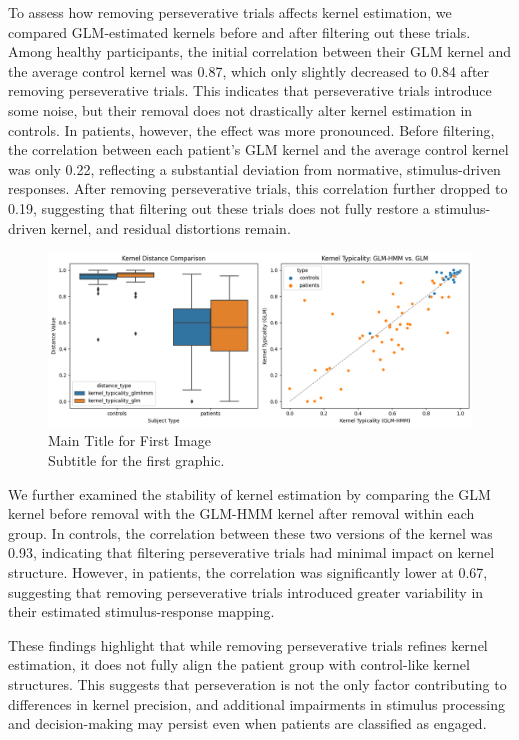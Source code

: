 To assess how removing perseverative trials affects kernel estimation, we compared GLM-estimated kernels before and after filtering out these trials. Among healthy participants, the initial correlation between their GLM kernel and the average control kernel was 0.87, which only slightly decreased to 0.84 after removing perseverative trials. This indicates that perseverative trials introduce some noise, but their removal does not drastically alter kernel estimation in controls. In patients, however, the effect was more pronounced. Before filtering, the correlation between each patient’s GLM kernel and the average control kernel was only 0.22, reflecting a substantial deviation from normative, stimulus-driven responses. After removing perseverative trials, this correlation further dropped to 0.19, suggesting that filtering out these trials does not fully restore a stimulus-driven kernel, and residual distortions remain.  
\begin{figure}[H]
    \centering
    \includegraphics[width=16cm]{MainLayout/Images/chapter7/distance.png}
    \caption{Main Title for First Image \\ \small Subtitle for the first graphic.}
    \label{fig:distance}
\end{figure}
We further examined the stability of kernel estimation by comparing the GLM kernel before removal with the GLM-HMM kernel after removal within each group. In controls, the correlation between these two versions of the kernel was 0.93, indicating that filtering perseverative trials had minimal impact on kernel structure. However, in patients, the correlation was significantly lower at 0.67, suggesting that removing perseverative trials introduced greater variability in their estimated stimulus-response mapping.  

These findings highlight that while removing perseverative trials refines kernel estimation, it does not fully align the patient group with control-like kernel structures. This suggests that perseveration is not the only factor contributing to differences in kernel precision, and additional impairments in stimulus processing and decision-making may persist even when patients are classified as engaged.

